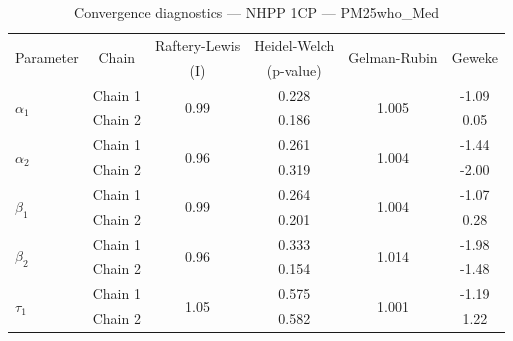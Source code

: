 \begin{table}[H]
\centering
\caption{Convergence diagnostics — NHPP 1CP — PM25who_Med}
\begin{tabular}{lccccc}
\toprule
\multirow{2}{*}{Parameter} & \multirow{2}{*}{Chain} & Raftery-Lewis & Heidel-Welch & \multirow{2}{*}{Gelman-Rubin} & \multirow{2}{*}{Geweke} \\
 & & (I) & (p-value) & & (z) \\
\midrule
\multirow{2}{*}{$\alpha_1$} & Chain 1 & \multirow{2}{*}{0.99} & 0.228 & \multirow{2}{*}{1.005} & -1.09 \\
 & Chain 2 & & 0.186 & & 0.05 \\
\multirow{2}{*}{$\alpha_2$} & Chain 1 & \multirow{2}{*}{0.96} & 0.261 & \multirow{2}{*}{1.004} & -1.44 \\
 & Chain 2 & & 0.319 & & -2.00 \\
\midrule
\multirow{2}{*}{$\beta_1$} & Chain 1 & \multirow{2}{*}{0.99} & 0.264 & \multirow{2}{*}{1.004} & -1.07 \\
 & Chain 2 & & 0.201 & & 0.28 \\
\multirow{2}{*}{$\beta_2$} & Chain 1 & \multirow{2}{*}{0.96} & 0.333 & \multirow{2}{*}{1.014} & -1.98 \\
 & Chain 2 & & 0.154 & & -1.48 \\
\midrule
\multirow{2}{*}{$\tau_1$} & Chain 1 & \multirow{2}{*}{1.05} & 0.575 & \multirow{2}{*}{1.001} & -1.19 \\
 & Chain 2 & & 0.582 & & 1.22 \\
\bottomrule
\end{tabular}
\end{table}
